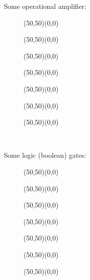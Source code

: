 	Some operational amplifier: 
	\begin{figure}[H]
		\vspace{1cm}
		\begin{center}
		\begin{picture}(50,50)(0,0)
		\end{picture}
		\begin{picture}(50,50)(0,0)
		\end{picture}
		\begin{picture}(50,50)(0,0)
		\end{picture}
		\begin{picture}(50,50)(0,0)
		\end{picture}
		\begin{picture}(50,50)(0,0)
		\end{picture}
		\begin{picture}(50,50)(0,0)
		\end{picture}
		\begin{picture}(50,50)(0,0)
		\end{picture}\\[2cm]
		\end{center}
	\end{figure}
	
	Some logic (boolean) gates:
	\begin{figure}[H]
		\vspace{1cm}
		\begin{center}
		\begin{picture}(50,50)(0,0)
		\end{picture}
		\begin{picture}(50,50)(0,0)
		\end{picture}
		\begin{picture}(50,50)(0,0)
		\end{picture}
		\begin{picture}(50,50)(0,0)
		\end{picture}
		\begin{picture}(50,50)(0,0)
		\end{picture}
		\begin{picture}(50,50)(0,0)
		\end{picture}
		\begin{picture}(50,50)(0,0)
		\end{picture}\\[2cm]
		\end{center}
	\end{figure}
	
